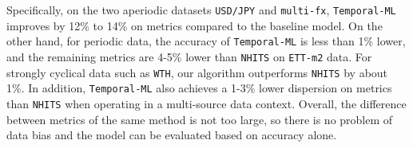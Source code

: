 

Specifically, on the two aperiodic datasets \verb|USD/JPY| and \verb|multi-fx|, \verb|Temporal-ML| improves by 12\% to 14\% on metrics compared to the baseline model. On the other hand, for periodic data, the accuracy of \verb|Temporal-ML| is less than 1\% lower, and the remaining metrics are 4-5\% lower than \verb|NHITS| on \verb|ETT-m2| data. For strongly cyclical data such as \verb|WTH|, our algorithm outperforms \verb|NHITS| by about 1\%. In addition, \verb|Temporal-ML| also achieves a 1-3\% lower dispersion on metrics than \verb|NHITS| when operating in a multi-source data context. Overall, the difference between metrics of the same method is not too large, so there is no problem of data bias and the model can be evaluated based on accuracy alone.

